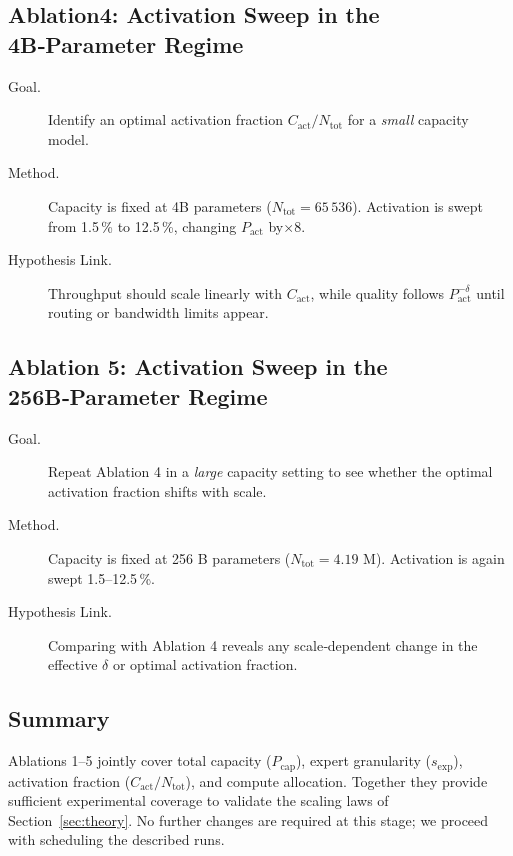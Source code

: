 \documentclass[11pt]{article}
\begin{document}
\subsection{Ablation4: Activation Sweep in the 4B‑Parameter Regime}
\begin{description}
  \item[Goal.]  Identify an optimal activation fraction
        $C_{\mathrm{act}}/N_{\mathrm{tot}}$ for a \emph{small} capacity
        model.
  \item[Method.]  
        Capacity is fixed at 4B parameters
        ($N_{\mathrm{tot}} = 65\,536$).  Activation is swept from
        1.5\,\% to 12.5\,\%, changing $P_{\mathrm{act}}$ by$\times 8$.
  \item[Hypothesis Link.]  
        Throughput should scale linearly with $C_{\mathrm{act}}$, while
        quality follows $P_{\mathrm{act}}^{-\delta}$ until routing or
        bandwidth limits appear.
\end{description}

\subsection{Ablation 5: Activation Sweep in the 256B‑Parameter Regime}
\begin{description}
  \item[Goal.]  Repeat Ablation 4 in a \emph{large} capacity setting to
        see whether the optimal activation fraction shifts with scale.
  \item[Method.]  
        Capacity is fixed at 256 B parameters
        ($N_{\mathrm{tot}} = 4.19$ M).  Activation is again swept
        1.5–12.5\,\%.
  \item[Hypothesis Link.]  
        Comparing with Ablation 4 reveals any scale‑dependent change in
        the effective $\delta$ or optimal activation fraction.
\end{description}

\subsection{Summary}

Ablations 1–5 jointly cover total capacity ($P_{\mathrm{cap}}$),
expert granularity ($s_{\mathrm{exp}}$), activation fraction
($C_{\mathrm{act}}/N_{\mathrm{tot}}$), and compute allocation.  Together
they provide sufficient experimental coverage to validate the scaling
laws of Section~\ref{sec:theory}.  No further changes are required at
this stage; we proceed with scheduling the described runs.
\end{document}
